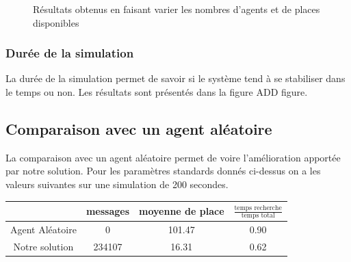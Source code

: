 \begin{figure}
\begin{center}
  \end{center}

  \caption{Résultats obtenus en faisant varier les nombres d'agents et de places disponibles}
  \label{nbagents:all}
\end{figure}

\subsubsection{Durée de la simulation}

La durée de la simulation permet de savoir si le système tend à se stabiliser dans le temps ou non.
Les résultats sont présentés dans la figure ADD figure.

\subsection{Comparaison avec un agent aléatoire}

La comparaison avec un agent aléatoire permet de voire l'amélioration apportée par notre solution.
Pour les paramètres standards donnés ci-dessus on a les valeurs suivantes sur une simulation de 200 secondes.

\begin{center}
  \begin{tabular}{c|c|c|c}
    & messages      & moyenne de place & $\frac{\mbox{temps recherche}}{\mbox{temps total}}$\\
    \hline
    Agent Aléatoire & 0        & 101.47                            & 0.90\\
    \hline
    Notre solution  & 234107   & 16.31                             & 0.62\\
  \end{tabular}
\end{center}

